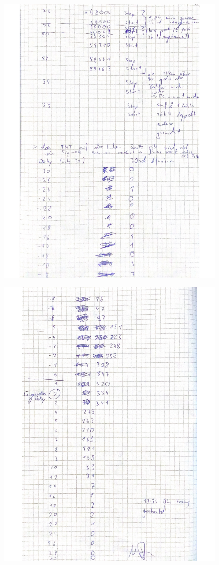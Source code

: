  \begin{figure}[H]
   \centering
   \includegraphics[width=\textwidth]{bilder/Messwerte_2_Myonen.pdf}
   \label{fig:Messungen_2}
 \end{figure}
 
 \begin{figure}[H]
   \centering
   \includegraphics[width=\textwidth]{bilder/Messwerte_3_Myonen.pdf}
   \label{fig:Messungen_3}
 \end{figure}